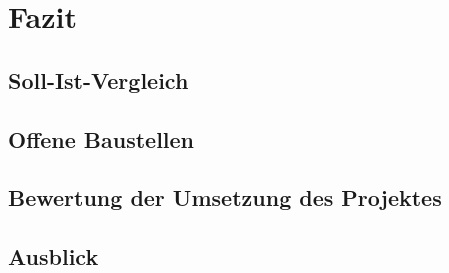 \section{Fazit}
\label{sec:Fazit}

\subsection{Soll-Ist-Vergleich}
\label{sec:Overview}

\subsection{Offene Baustellen}
\label{sec:Baustellen}

\subsection{Bewertung der Umsetzung des Projektes}
\label{sec:Bewertung}

\subsection{Ausblick}
\label{sec:Ausblick}



